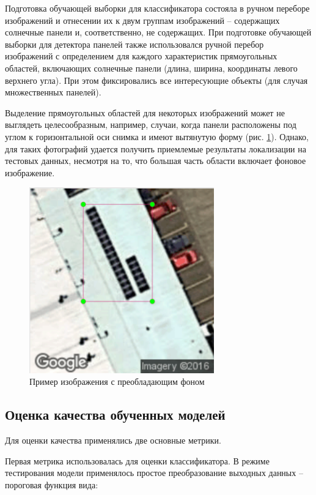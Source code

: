 Подготовка обучающей выборки для классификатора состояла в ручном переборе изображений и отнесении их к двум группам изображений -- содержащих солнечные панели и, соответственно, не содержащих. При подготовке обучающей выборки для детектора панелей также использовался ручной перебор изображений с определением для каждого характеристик прямоугольных областей, включающих солнечные панели (длина, ширина, координаты левого верхнего угла). При этом фиксировались все интересующие объекты (для случая множественных панелей). 

Выделение прямоугольных областей для некоторых изображений может не выглядеть целесообразным, например, случаи, когда панели расположены под углом к горизонтальной оси снимка и имеют вытянутую форму (рис. \ref{fig:background_dominate}). Однако, для таких фотографий удается получить приемлемые результаты локализации на тестовых данных, несмотря на то, что большая часть области включает фоновое изображение.
 
\begin{figure}[ht]
	\centering
	\includegraphics[width=8cm]{man-source/images/ch4/pic4-18.png}
	\caption{Пример изображения с преобладающим фоном}
	\label{fig:background_dominate}
\end{figure}

\subsection{Оценка качества обученных моделей}

Для оценки качества применялись две основные метрики. 

Первая метрика использовалась для оценки классификатора. В режиме тестирования модели применялось простое преобразование выходных данных -- пороговая функция вида:

